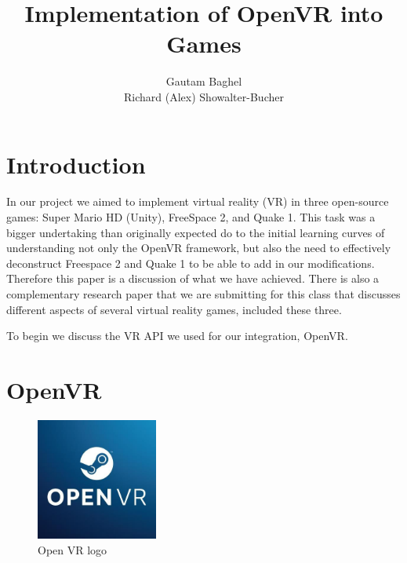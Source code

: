 \documentclass[journal]{IEEEtran}
\begin{document}
%
\title{Implementation of OpenVR into Games}
%
%
%

\author{Gautam Baghel\\Richard (Alex) Showalter-Bucher}


\maketitle

\newpage
\tableofcontents
\newpage

\section{Introduction}
In our project we aimed to implement virtual reality (VR) in three open-source games: Super Mario HD (Unity), FreeSpace 2, and Quake 1. This task was a bigger undertaking than originally expected do to the initial learning curves of understanding not only the OpenVR framework, but also the need to effectively deconstruct Freespace 2 and Quake 1 to be able to add in our modifications. Therefore this paper is a discussion of what we have achieved. There is also a complementary research paper that we are submitting for this class that discusses different aspects of several virtual reality games, included these three. 

To begin we discuss the VR API we used for our integration, OpenVR.

\section{OpenVR}


\begin{figure}[H]
	\includegraphics[width=4cm, height=4cm]{openvr} 
	\centering
	\caption{Open VR logo \cite{openVR_images}}
\end{figure}
\end{document}
